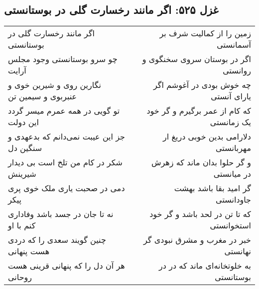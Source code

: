 \begin{center}
\section*{غزل ۵۲۵: اگر مانند رخسارت گلی در بوستانستی}
\label{sec:525}
\begin{longtable}{l p{0.5cm} r}
اگر مانند رخسارت گلی در بوستانستی
&&
زمین را از کمالیت شرف بر آسمانستی
\\
چو سرو بوستانستی وجود مجلس آرایت
&&
اگر در بوستان سروی سخنگوی و روانستی
\\
نگارین روی و شیرین خوی و عنبربوی و سیمین تن
&&
چه خوش بودی در آغوشم اگر یارای آنستی
\\
تو گویی در همه عمرم میسر گردد این دولت
&&
که کام از عمر برگیرم و گر خود یک زمانستی
\\
جز این عیبت نمی‌دانم که بدعهدی و سنگین دل
&&
دلارامی بدین خوبی دریغ ار مهربانستی
\\
شکر در کام من تلخ است بی دیدار شیرینش
&&
و گر حلوا بدان ماند که زهرش در میانستی
\\
دمی در صحبت یاری ملک خوی پری پیکر
&&
گر امید بقا باشد بهشت جاودانستی
\\
نه تا جان در جسد باشد وفاداری کنم با او
&&
که تا تن در لحد باشد و گر خود استخوانستی
\\
چنین گویند سعدی را که دردی هست پنهانی
&&
خبر در مغرب و مشرق نبودی گر نهانستی
\\
هر آن دل را که پنهانی قرینی هست روحانی
&&
به خلوتخانه‌ای ماند که در در بوستانستی
\\
\end{longtable}
\end{center}
